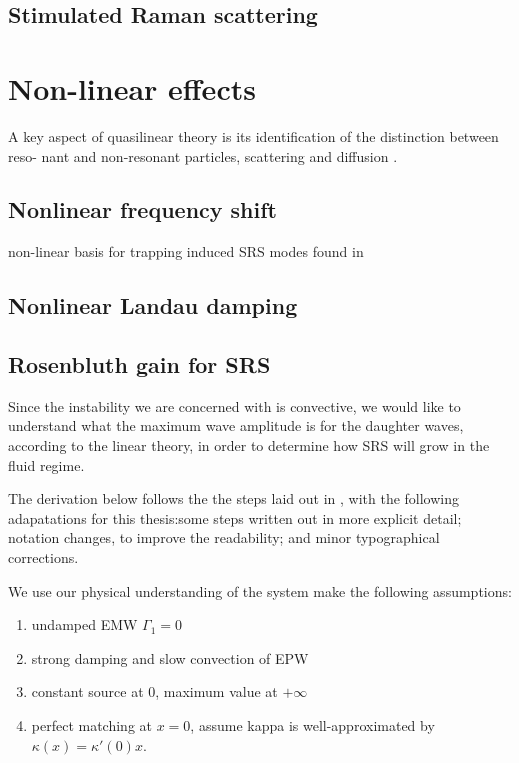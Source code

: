 \subsection{Stimulated Raman scattering}


\section{Non-linear effects}
A key aspect of quasilinear theory is its identification of the distinction between reso-
nant and non-resonant particles, scattering and diffusion \citep{Sagdeev2018}.

\subsection{Nonlinear frequency shift}
non-linear basis for trapping induced SRS modes found in \cite{Rose2001}
\subsection{Nonlinear Landau damping}



\subsection{Rosenbluth gain for SRS}

Since the instability we are concerned with is convective, we would like to understand what the maximum wave amplitude is for the daughter waves, according to the linear theory, in order to determine how SRS will grow in the fluid regime.

The derivation below follows the the steps laid out in \citet{Nishikawa1976}, with the following adapatations for this thesis:some steps written out in more explicit detail; notation changes, to improve the readability; and minor typographical corrections. 

We use our physical understanding of the system make the following assumptions:
\begin{enumerate}
	\item undamped EMW $\Gamma_1 = 0$
	\item strong damping and slow convection of EPW
	\item constant source at 0, maximum value at $+\infty$
	\item perfect matching at $x=0$, assume kappa is well-approximated by 
	$\kappa(x) = \kappa'(0)x$.
\end{enumerate}

